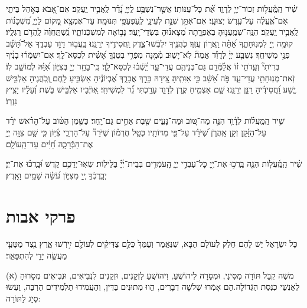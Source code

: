 \documentclass[twoside, openany, parskip=half, 11pt]{book}
\begin{document}
 שִׁ֗יר הַֽמַּֽ֫עֲל֥וֹת זְכוֹר־יְיָ֥ לְדָוִ֑ד אֵ֝֗ת כָּל־עֻנּוֹתֽוֹ׃ אֲשֶׁ֣ר־נִשְׁבַּ֥ע לַֽיְיָ֑ נָ֝דַ֗ר לַֽאֲבִ֥יר יַֽעֲקֹֽב׃ אִם־אָ֭בֹא בְּאֹ֣הֶל בֵּיתִ֑י אִם־אֶֽ֝עֱלֶ֗ה עַל־עֶ֥רֶשׂ יְצוּעָֽי׃ אִם־אֶתֵּ֣ן שְׁנָ֣ת לְעֵינָ֑י לְֽעַפְעַפַּ֥י תְּנוּמָֽה׃ עַד־אֶמְצָ֣א מָ֭קוֹם לַיְיָ֑ מִ֝שְׁכָּנ֗וֹת לַֽאֲבִ֥יר יַֽעֲקֹֽב׃ הִנֵּֽה־שְׁמַֽעֲנ֥וּהָ בְאֶפְרָ֑תָה מְ֝צָאנ֗וּהָ בִּשְׂדֵי־יָֽעַר׃ נָב֥וֹאָה לְמִשְׁכְּֿנוֹתָ֑יו נִֽ֝שְׁתַּֽחֲוֶ֗ה לַֽהֲדֹ֥ם רַגְלָֽיו׃ קוּמָ֣ה יְ֖יָ לִמְנֽוּחָתֶ֑ךָ אַ֝תָּ֗ה וַֽאֲר֥וֹן עֻזֶּֽךָ׃ כֹּֽהֲנֶ֥יךָ יִלְבְּֿשׁוּ־צֶ֑דֶק וַֽחֲסִידֶ֥יךָ יְרַנֵּֽנוּ׃ בַּֽעֲב֣וּר דָּוִ֣ד עַבְדֶּ֑ךָ אַל־תָּ֝שֵׁ֗ב פְּנֵ֣י מְשִׁיחֶֽךָ׃ נִשְׁבַּ֤ע יְיָ֨ לְדָוִ֡ד אֱמֶת֘ לֹֽא־יָשׁ֢וּב מִ֫מֶּ֥נָּה מִפְּֿרִ֥י בִטְנְֿךָ֑ אָ֝שִׁ֗ית לְכִסֵּא־לָֽךְ׃ אִם־יִשְׁמְֿר֬וּ בָנֶ֨יךָ בְּרִיתִי֘ וְעֵֽדֹתִ֥י ז֗וֹ אֲלַ֫מְּֿדֵ֥ם גַּם־בְּנֵיהֶ֥ם עֲדֵי־עַ֑ד יֵֽ֝שְֿׁב֗וּ לְכִסֵּא־לָֽךְ׃ כִּֽי־בָחַ֣ר יְיָ֣ בְּצִיּ֑וֹן אִ֝וָּ֗הּ לְמוֹשָׁ֥ב לֽוֹ׃ זֹֽאת־מְנֽוּחָתִ֥י עֲדֵי־עַ֑ד פֹּ֣ה אֵ֝שֵׁ֗ב כִּ֣י אִוִּתִֽיהָ׃ צֵ֭ידָהּ בָּרֵ֣ךְ אֲבָרֵ֑ךְ אֶ֝בְיוֹנֶ֗יהָ אַשְׂבִּ֥יעַ לָֽחֶם׃ וְֽ֭כֹֽהֲנֶיהָ אַלְבִּ֖ישׁ יֶ֑שַׁע וַֽ֝חֲסִידֶ֗יהָ רַנֵּ֥ן יְרַנֵּֽנוּ׃ שָׁ֤ם אַצְמִ֣יחַ קֶ֣רֶן לְדָוִ֑ד עָרַ֥כְתִּי נֵ֝֗ר לִמְשִׁיחִֽי׃ אֽ֭וֹיְֿבָיו אַלְבִּ֣ישׁ בֹּ֑שֶׁת וְ֝עָלָ֗יו יָצִ֥יץ נִזְרֽוֹ׃

 שִׁ֥יר הַֽמַּֽעֲל֗וֹת לְדָ֫וִ֥ד הִנֵּ֣ה מַה־טּ֭וֹב וּמַה־נָּעִ֑ים שֶׁ֖בֶת אַחִ֣ים גַּם־יָֽחַד׃ כַּשֶּׁ֤מֶן הַטּ֨וֹב עַל־הָרֹ֗אשׁ יֹרֵ֗ד עַל־הַזָּ֫קָ֥ן זְקַ֥ן אַֽהֲרֹ֑ן שֶׁ֝יֹּרֵ֗ד עַל־פִּ֥י מִדּוֹתָֽיו׃ כְּטַ֥ל חֶרְמ֗וֹן שֶׁיֹּרֵד֘ עַל־הַרְרֵ֢י צִ֫יּ֥וֹן כִּ֤י שָׁ֤ם צִוָּ֣ה יְיָ֣ אֶת־הַבְּֿרָכָ֑ה חַ֝יִּ֗ים עַד־הָֽעוֹלָֽם׃

 שִׁ֗יר הַֽמַּֽ֫עֲל֥וֹת הִנֵּ֤ה בָּֽרֲכ֣וּ אֶת־יְ֖יָ כָּל־עַבְדֵ֣י יְיָ֑ הָֽעֹמְֿדִ֥ים בְּבֵית־יְ֜יָ֗ בַּלֵּילֽוֹת׃ שְׂאֽוּ־יְדֵכֶ֥ם קֹ֑דֶשׁ וּ֝בָֽרֲכ֗וּ אֶת־יְיָ׃ יְבָֽרֶכְֿךָ֣ יְ֖יָ מִצִּיּ֑וֹן עֹ֝שֵׂ֗ה שָׁמַ֥יִם וָאָֽרֶץ׃ 



\section[פרקי אבות]{ פרקי אבות }
\label{avos}

\newcommand{\kolyisroel}{
כָּל יִשְׂרָאֵל יֵשׁ לָהֶם חֵלֶק לְעוֹלָם הַבָּא, שֶׁנֶּאֱמַר וְעַמֵּךְ֙ \source{ישעשה ס}כֻּלָּ֣ם צַדִּיקִ֔ים לְעוֹלָ֖ם
 יִ֣ירְֿשׁוּ אָ֑רֶץ נֵ֧צֶר מַטָּעַ֛י מַעֲשֵׂ֥ה יָדַ֖י לְהִתְפָּאֵֽר׃
}

\kolyisroel

(א) משֶׁה קִבֵּל תּוֹרָה מִסִּינַי, וּמְסָרָהּ לִיהוֹשֻׁעַ, וִיהוֹשֻׁעַ לִזְקֵנִים, וּזְקֵנִים לִנְבִיאִים, וּנְבִיאִים מְסָרוּהָ לְאַנְשֵׁי כְנֶסֶת הַגְּֿדוֹלָה.הֵם אָמְֿרוּ שְׁלשָׁה דְבָרִים, הֱווּ מְתוּנִים בַּדִּין, וְהַעֲמִידוּ תַלְמִידִים הַרְבֵּה, וַעֲשׂוּ סְיָג לַתּוֹרָה:
\end{document}
